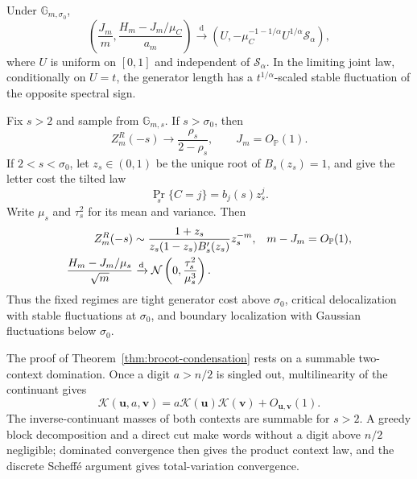 \begin{corollary}
\label{thm:critical-fibonacci-gibbs-geometry}
Under \(\mathbb G_{m,\sigma_0}\),
\begin{equation}
 \left(\frac{J_m}{m},
       \frac{H_m-J_m/\mu_C}{a_m}\right)
 \xrightarrow{\mathrm d}
 \left(U,-\mu_C^{-1-1/\alpha}U^{1/\alpha}\mathcal S_\alpha\right),
 \label{eq:critical-fibonacci-gibbs-geometry}
\end{equation}
where \(U\) is uniform on \([0,1]\) and independent of
\(\mathcal S_\alpha\).  In the limiting joint law, conditionally on
\(U=t\), the generator length has a
\(t^{1/\alpha}\)-scaled stable fluctuation of the opposite spectral sign.
\end{corollary}

\begin{corollary}
\label{cor:fibonacci-three-regime}
Fix \(s>2\) and sample from \(\mathbb G_{m,s}\).  If \(s>\sigma_0\), then
\begin{equation}
 Z_m^R(-s)\longrightarrow\frac{\rho_s}{2-\rho_s},
 \qquad J_m=O_{\mathbb P}(1).
 \label{eq:supercritical-tight-regime}
\end{equation}
If \(2<s<\sigma_0\), let \(z_s\in(0,1)\) be the unique root of
\(B_s(z_s)=1\), and give the letter cost the tilted law
\[
 \Pr_s\{C=j\}=b_j(s)z_s^j.
\]
Write \(\mu_s\) and \(\tau_s^2\) for its mean and variance.  Then
\begin{align}
 Z_m^R(-s)&\sim
 \frac{1+z_s}{z_s(1-z_s)B_s'(z_s)}z_s^{-m},
 &m-J_m&=O_{\mathbb P}(1),
 \label{eq:subcritical-boundary-regime}\\
 \frac{H_m-J_m/\mu_s}{\sqrt m}
 &\xrightarrow{\rm d}
 \mathcal N\left(0,\frac{\tau_s^2}{\mu_s^3}\right).
 \label{eq:subcritical-gaussian-length}
\end{align}
Thus the fixed regimes are tight generator cost above \(\sigma_0\),
critical delocalization with stable fluctuations at \(\sigma_0\), and
boundary localization with Gaussian fluctuations below \(\sigma_0\).
\end{corollary}

The proof of Theorem~\ref{thm:brocot-condensation} rests on a summable
two-context domination.  Once a digit \(a>n/2\) is singled out,
multilinearity of the continuant gives
\[
 \mathcal K(\mathbf u,a,\mathbf v)
 =a\mathcal K(\mathbf u)\mathcal K(\mathbf v)
  +O_{\mathbf u,\mathbf v}(1).
\]
The inverse-continuant masses of both contexts are summable for \(s>2\).
A greedy block decomposition and a direct cut make words without a digit
above \(n/2\) negligible; dominated convergence then gives the product
context law, and the discrete Scheff\'e argument gives total-variation
convergence.

